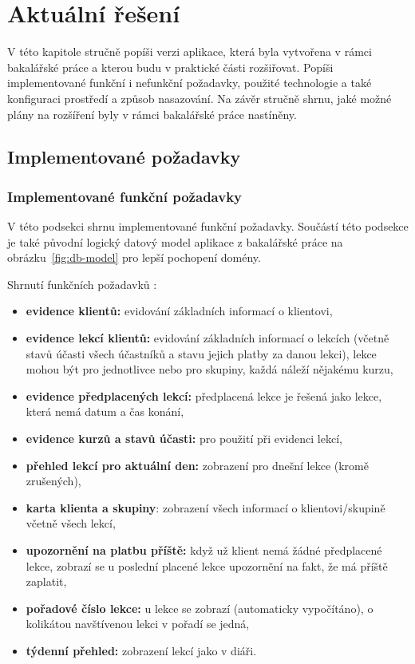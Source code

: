 \chapter{Aktuální řešení}

V této kapitole stručně popíši verzi aplikace, která byla vytvořena v rámci bakalářské práce \cite{bp} a kterou budu v praktické části rozšiřovat. Popíši implementované funkční i nefunkční požadavky, použité technologie a také konfiguraci prostředí a způsob nasazování. Na závěr stručně shrnu, jaké možné plány na rozšíření byly v rámci bakalářské práce nastíněny.

\section{Implementované požadavky}

\subsection{Implementované funkční požadavky}

V této podsekci shrnu implementované funkční požadavky. Součástí této podsekce je také původní logický datový model aplikace z bakalářské práce \cite{bp} na obrázku~\ref{fig:db-model} pro lepší pochopení domény.

Shrnutí funkčních požadavků \cite{bp}:
\begin{itemize}
    \item \textbf{evidence klientů:} evidování základních informací o klientovi,
    \item \textbf{evidence lekcí klientů:} evidování základních informací o lekcích (včetně stavů účasti všech účastníků a stavu jejich platby za danou lekci), lekce mohou být pro jednotlivce nebo pro skupiny, každá náleží nějakému kurzu,
    \item \textbf{evidence předplacených lekcí:} předplacená lekce je řešená jako lekce, která nemá datum a čas konání,
    \item \textbf{evidence kurzů a stavů účasti:} pro použití při evidenci lekcí,
    \item \textbf{přehled lekcí pro aktuální den:} zobrazení pro dnešní lekce (kromě zrušených),
    \item \textbf{karta klienta a skupiny}: zobrazení všech informací o klientovi/skupině včetně všech lekcí,
    \item \textbf{upozornění na platbu příště:} když už klient nemá žádné předplacené lekce, zobrazí se u poslední placené lekce upozornění na fakt, že má příště zaplatit,
    \item \textbf{pořadové číslo lekce:} u lekce se zobrazí (automaticky vypočítáno), o kolikátou navštívenou lekci v pořadí se jedná,
    \item \textbf{týdenní přehled:} zobrazení lekcí jako v diáři.
\end{itemize}

